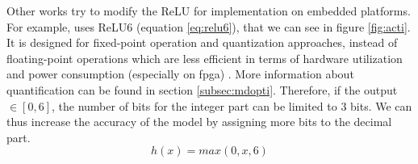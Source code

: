 Other works try to modify the ReLU for implementation on embedded platforms. For example, \cite{howard_mobilenets_2017} uses ReLU6 (equation \ref{eq:relu6}), that we can see in figure \ref{fig:acti}. It is designed for fixed-point operation and quantization approaches, instead of floating-point operations which are less efficient in terms of hardware utilization and power consumption (especially on \acrshort{fpga}) \cite{david_hardware_2007}. More information about quantification can be found in section \ref{subsec:mdopti}. Therefore, if the output $\in [ 0, 6 ]$, the number of bits for the integer part can be limited to 3 bits. We can thus increase the accuracy of the model by assigning more bits to the decimal part.
%
\begin{equation}
    h(x) = max(0, x, 6)
    \label{eq:relu6}
\end{equation}

